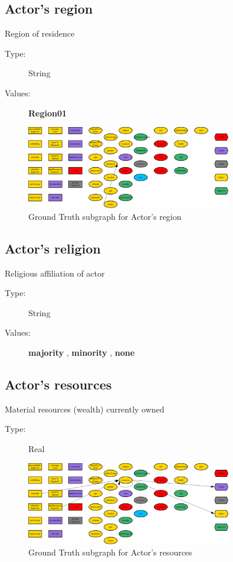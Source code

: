 \documentclass{article}%
\begin{document}
%
\subsection{Actor's region}%
\label{subsec:Actor's region}%
Region of residence%
\begin{description}%
\item[Type:]%
String%
\item[Values:]%
\textbf{Region01}%
\end{description}%


\begin{figure}[ht]%
\centering%
\includegraphics[width=0.8\textwidth]{images/regionOfActor.png}%
\caption{Ground Truth subgraph for Actor's region}%
\end{figure}

%
\subsection{Actor's religion}%
\label{subsec:Actor's religion}%
Religious affiliation of actor%
\begin{description}%
\item[Type:]%
String%
\item[Values:]%
\textbf{majority}%
, %
\textbf{minority}%
, %
\textbf{none}%
\end{description}

%
\subsection{Actor's resources}%
\label{subsec:Actor's resources}%
Material resources (wealth) currently owned%
\begin{description}%
\item[Type:]%
Real%
\end{description}%


\begin{figure}[ht]%
\centering%
\includegraphics[width=0.8\textwidth]{images/resourcesOfActor.png}%
\caption{Ground Truth subgraph for Actor's resources}%
\end{figure}
\end{document}
